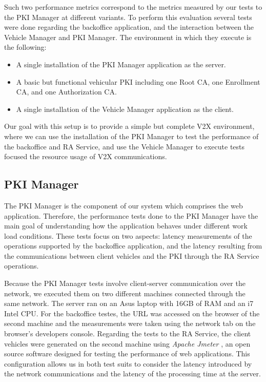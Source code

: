 Such two performance metrics correspond to the metrics measured by our tests to the PKI Manager at different variants. To perform this evaluation several tests were done regarding the backoffice application, and the interaction between the Vehicle Manager and PKI Manager. The environment in which they execute is the following: 

\begin{itemize}
	\item A single installation of the PKI Manager application as the server. 
	\item A basic but functional vehicular PKI including one Root CA, one Enrollment CA, and one Authorization CA.
	\item A single installation of the Vehicle Manager application as the client. 	
\end{itemize}
Our goal with this setup is to provide a simple but complete V2X environment, where we can use the installation of the PKI Manager to test the performance of the backoffice and RA Service, and use the Vehicle Manager to execute tests focused the resource usage of V2X communications. 

\subsection{PKI Manager}
The PKI Manager is the component of our system which comprises the web application. Therefore, the performance tests done to the PKI Manager have the main goal of understanding how the application behaves under different work load conditions. These tests focus on two aspects: latency measurements of the operations supported by the backoffice application, and the latency resulting from the communications between client vehicles and the PKI through the RA Service operations.

Because the PKI Manager tests involve client-server communication over the network, we executed them on two different machines connected through the same network. The server ran on an Asus laptop with 16GB of RAM and an i7 Intel CPU. For the backoffice testes, the URL was accessed on the browser of the second machine and the measurements were taken using the network tab on the browser's developers console. Regarding the tests to the RA Service, the client vehicles were generated on the second machine using \textit{Apache Jmeter} \cite{jmeter}, an open source software designed for testing the performance of web applications. This configuration allows us in both test suits to consider the latency introduced by the network communications and the latency of the processing time at the server. 


